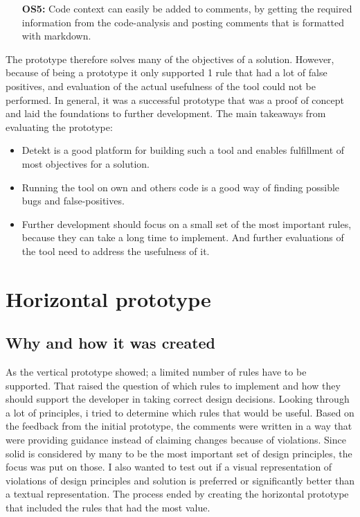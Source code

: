 \documentclass{report}
\begin{document}
\begin{itemize}
    \item [\textbf{OS5:}] Code context can easily be added to comments, by getting the required information from the code-analysis and posting comments that is formatted with markdown.

\end{itemize}

The prototype therefore solves many of the objectives of a solution. However, because of being a prototype it only supported 1 rule that had a lot of false positives, and evaluation of the actual usefulness of the tool could not be performed. In general, it was a successful prototype that was a proof of concept and laid the foundations to further development. The main takeaways from evaluating the prototype:
\begin{itemize}
    \item Detekt is a good platform for building such a tool and enables fulfillment of most objectives for a solution.
    \item Running the tool on own and others code is a good way of finding possible bugs and false-positives.
    \item Further development should focus on a small set of the most important rules, because they can take a long time to implement. And further evaluations of the tool need to address the usefulness of it.
\end{itemize}

\section{Horizontal prototype}

\subsection*{Why and how it was created}
As the vertical prototype showed; a limited number of rules have to be supported. That raised the question of which rules to implement and how they should support the developer in taking correct design decisions. Looking through a lot of principles, i tried to determine which rules that would be useful. Based on the feedback from the initial prototype, the comments were written in a way that were providing guidance instead of claiming changes because of violations. Since \gls{solid} is considered by many to be the most important set of design principles, the focus was put on those. I also wanted to test out if a visual representation of violations of design principles and solution is preferred or significantly better than a textual representation. The process ended by creating the horizontal prototype that included the rules that had the most value. 
\end{document}
